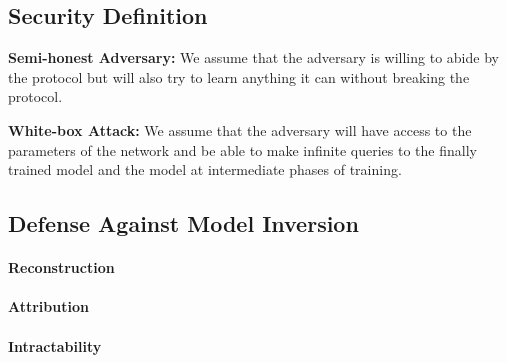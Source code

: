 \subsection{Security Definition}
\textbf{Semi-honest Adversary:}
We assume that the adversary is willing to abide by the protocol but will also try to learn anything it can without breaking the protocol.

\textbf{White-box Attack:}
We assume that the adversary will have access to the parameters of the network and be able to make infinite queries to the finally trained model and the model at intermediate phases of training.

\subsection{Defense Against Model Inversion}
\paragraph{Reconstruction}

\paragraph{Attribution}

\paragraph{Intractability}